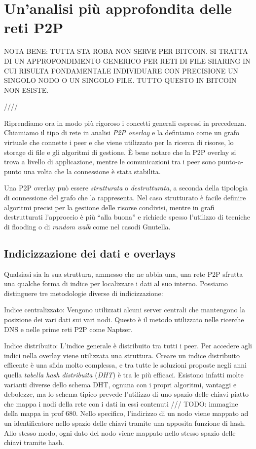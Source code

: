 \chapter{Un'analisi più approfondita delle reti
P2P}\label{unanalisi-piuxf9-approfondita-delle-reti-p2p}

NOTA BENE: TUTTA STA ROBA NON SERVE PER BITCOIN. SI TRATTA DI UN
APPROFONDIMENTO GENERICO PER RETI DI FILE SHARING IN CUI RISULTA
FONDAMENTALE INDIVIDUARE CON PRECISIONE UN SINGOLO NODO O UN SINGOLO
FILE. TUTTO QUESTO IN BITCOIN NON ESISTE.

////

Riprendiamo ora in modo più rigoroso i concetti generali espressi in
precedenza. Chiamiamo il tipo di rete in analisi \emph{P2P overlay} e la
definiamo come un grafo virtuale che connette i peer e che viene
utilizzato per la ricerca di risorse, lo storage di file e gli algoritmi
di gestione. È bene notare che la P2P overlay si trova a livello di
applicazione, mentre le comunicazioni tra i peer sono punto-a-punto una
volta che la connessione è stata stabilita.

Una P2P overlay può essere \emph{strutturata} o \emph{destrutturata}, a
seconda della tipologia di connessione del grafo che la rappresenta. Nel
caso strutturato è facile definire algoritmi precisi per la gestione
delle risorse condivisi, mentre in grafi destrutturati l'approccio è più
``alla buona'' e richiede spesso l'utilizzo di tecniche di flooding o di
\emph{random walk} come nel casodi Gnutella.

\section{Indicizzazione dei dati e
overlays}\label{indicizzazione-dei-dati-e-overlays}

Qualsiasi sia la sua struttura, ammesso che ne abbia una, una rete P2P
sfrutta una qualche forma di indice per localizzare i dati al suo
interno. Possiamo distinguere tre metodologie diverse di indicizzazione:

Indice centralizzato: Vengono utilizzati alcuni server centrali che
mantengono la posizione dei vari dati sui vari nodi. Questo è il metodo
utilizzato nelle ricerche DNS e nelle prime reti P2P come Naptser.

Indice distribuito: L'indice generale è distribuito tra tutti i peer.
Per accedere agli indici nella overlay viene utilizzata una struttura.
Creare un indice distribuito efficente è una sfida molto complessa, e
tra tutte le soluzioni proposte negli anni quella \emph{tabella hash
distribuita} (\emph{DHT}) è tra le più efficaci. Esistono infatti molte
varianti diverse dello schema DHT, ognuna con i propri algoritmi,
vantaggi e debolezze, ma lo schema tipico prevede l'utilizzo di uno
spazio delle chiavi piatto che mappa i nodi della rete con i dati in
essi contenuti /// TODO: immagine della mappa in prof 680. Nello
specifico, l'indirizzo di un nodo viene mappato ad un identificatore
nello spazio delle chiavi tramite una apposita funzione di hash. Allo
stesso modo, ogni dato del nodo viene mappato nello stesso spazio delle
chiavi tramite hash.

